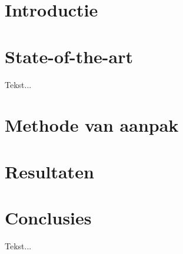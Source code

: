 \documentclass[fleqn,10pt]{voorstel}
\begin{document}
\flushbottom %

\maketitle %

\tableofcontents %

\thispagestyle{empty} %


\section{Introductie} %



\section{State-of-the-art}
Tekst...


\section{Methode van aanpak} \label{sec-moa}


\section{Resultaten}


\section{Conclusies}
Tekst...




\end{document}
